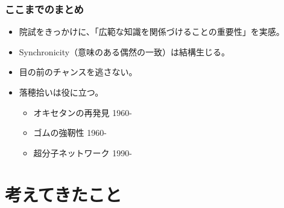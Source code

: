 \documentclass[unicode,12pt]{beamer}%
\begin{document}

\begin{frame}
    \frametitle{ここまでのまとめ}

    \begin{boxnote}
        \begin{itemize}
            \item 院試をきっかけに、\alert{「広範な知識を関係づけることの重要性」}を実感。
            \item Synchronicity（意味のある偶然の一致）は結構生じる。
            \item 目の前のチャンスを逃さない。
            \item 落穂拾いは役に立つ。
            \begin{itemize}
                \item オキセタンの再発見 1960-
                \item ゴムの強靭性 1960-
                \item 超分子ネットワーク 1990-
            \end{itemize}
        \end{itemize}
    \end{boxnote}

\end{frame}

\section{考えてきたこと}
\end{document}
